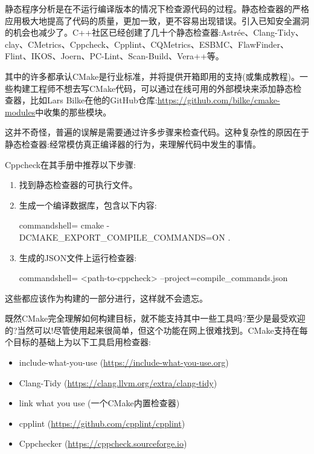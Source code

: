 
静态程序分析是在不运行编译版本的情况下检查源代码的过程。静态检查器的严格应用极大地提高了代码的质量，更加一致，更不容易出现错误。引入已知安全漏洞的机会也减少了。C++社区已经创建了几十个静态检查器:Astrée、Clang-Tidy、clay、CMetrics、Cppcheck、Cpplint、CQMetrics、ESBMC、FlawFinder、Flint、IKOS、Joern、PC-Lint、Scan-Build、Vera++等。

其中的许多都承认CMake是行业标准，并将提供开箱即用的支持(或集成教程)。一些构建工程师不想去写CMake代码，可以通过在线可用的外部模块来添加静态检查器，比如Lars Bilke在他的GitHub仓库:\url{https://github.com/bilke/cmake-modules}中收集的那些模块。

这并不奇怪，普遍的误解是需要通过许多步骤来检查代码。这种复杂性的原因在于静态检查器:经常模仿真正编译器的行为，来理解代码中发生的事情。

Cppcheck在其手册中推荐以下步骤:

\begin{enumerate}
\item 
找到静态检查器的可执行文件。

\item 
生成一个编译数据库，包含以下内容:

\begin{tcblisting}{commandshell={}}
cmake -DCMAKE_EXPORT_COMPILE_COMMANDS=ON .
\end{tcblisting}

\item 
生成的JSON文件上运行检查器:

\begin{tcblisting}{commandshell={}}
<path-to-cppcheck> --project=compile_commands.json
\end{tcblisting}
\end{enumerate}

这些都应该作为构建的一部分进行，这样就不会遗忘。

既然CMake完全理解如何构建目标，就不能支持其中一些工具吗?至少是最受欢迎的?当然可以!尽管使用起来很简单，但这个功能在网上很难找到。CMake支持在每个目标的基础上为以下工具启用检查器:

\begin{itemize}
\item 
include-what-you-use (\url{https://include-what-you-use.org})

\item 
Clang-Tidy (\url{https://clang.llvm.org/extra/clang-tidy})

\item 
link what you use (一个CMake内置检查器)

\item 
cpplint (\url{https://github.com/cpplint/cpplint})

\item 
Cppchecker (\url{https://cppcheck.sourceforge.io})
\end{itemize}


